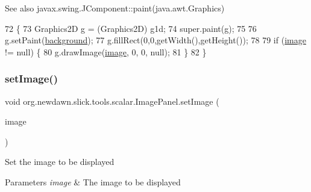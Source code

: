 \begin{DoxySeeAlso}{See also}
javax.\+swing.\+J\+Component\+::paint(java.\+awt.\+Graphics) 
\end{DoxySeeAlso}

\begin{DoxyCode}
72                                     \{
73         Graphics2D g = (Graphics2D) g1d;
74         super.paint(g);
75         
76         g.setPaint(\mbox{\hyperlink{classorg_1_1newdawn_1_1slick_1_1tools_1_1scalar_1_1_image_panel_a79f834ce107fe8e724112271649f0af8}{background}});
77         g.fillRect(0,0,getWidth(),getHeight());
78         
79         \textcolor{keywordflow}{if} (\mbox{\hyperlink{classorg_1_1newdawn_1_1slick_1_1tools_1_1scalar_1_1_image_panel_aecb459cf2f3adb87a772fdd4db61c191}{image}} != null) \{
80             g.drawImage(\mbox{\hyperlink{classorg_1_1newdawn_1_1slick_1_1tools_1_1scalar_1_1_image_panel_aecb459cf2f3adb87a772fdd4db61c191}{image}}, 0, 0, null);
81         \}
82     \}
\end{DoxyCode}
\mbox{\label{classorg_1_1newdawn_1_1slick_1_1tools_1_1scalar_1_1_image_panel_a16339485944d8c28fc4c198f5fc21705}} 
\subsubsection{\texorpdfstring{set\+Image()}{setImage()}}
{\footnotesize\ttfamily void org.\+newdawn.\+slick.\+tools.\+scalar.\+Image\+Panel.\+set\+Image (\begin{DoxyParamCaption}\item[{Buffered\+Image}]{image }\end{DoxyParamCaption})\hspace{0.3cm}{\ttfamily [inline]}}

Set the image to be displayed


\begin{DoxyParams}{Parameters}
{\em image} & The image to be displayed \\
\hline
\end{DoxyParams}

